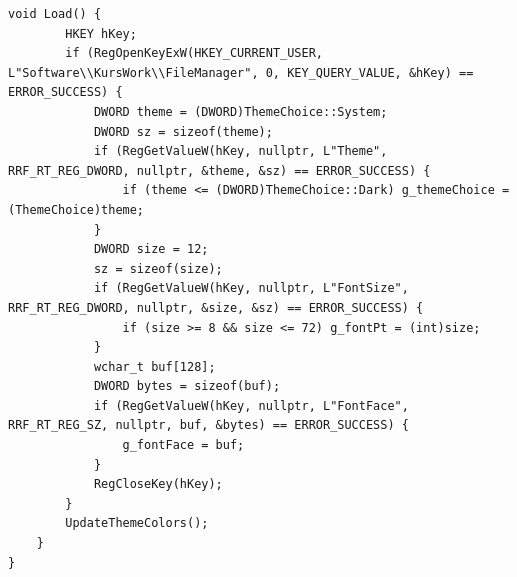\begin{lstlisting}[style=CodeListing]
    void Load() {
        HKEY hKey;
        if (RegOpenKeyExW(HKEY_CURRENT_USER, L"Software\\KursWork\\FileManager", 0, KEY_QUERY_VALUE, &hKey) == ERROR_SUCCESS) {
            DWORD theme = (DWORD)ThemeChoice::System; 
            DWORD sz = sizeof(theme);
            if (RegGetValueW(hKey, nullptr, L"Theme", RRF_RT_REG_DWORD, nullptr, &theme, &sz) == ERROR_SUCCESS) {
                if (theme <= (DWORD)ThemeChoice::Dark) g_themeChoice = (ThemeChoice)theme;
            }
            DWORD size = 12; 
            sz = sizeof(size);
            if (RegGetValueW(hKey, nullptr, L"FontSize", RRF_RT_REG_DWORD, nullptr, &size, &sz) == ERROR_SUCCESS) {
                if (size >= 8 && size <= 72) g_fontPt = (int)size;
            }
            wchar_t buf[128]; 
            DWORD bytes = sizeof(buf);
            if (RegGetValueW(hKey, nullptr, L"FontFace", RRF_RT_REG_SZ, nullptr, buf, &bytes) == ERROR_SUCCESS) {
                g_fontFace = buf;
            }
            RegCloseKey(hKey);
        }
        UpdateThemeColors();
    }
}
\end{lstlisting}

